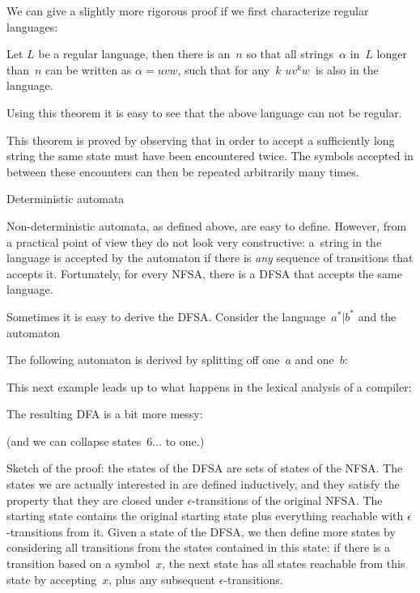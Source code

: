 We can give a slightly more rigorous proof if we first characterize
regular languages:
\begin{theorem}
Let $L$ be a regular language, then there is an~$n$ so that all
strings~$\alpha$ in~$L$ longer than~$n$ can be written as
$\alpha=uvw$, such that for any~$k$ $uv^kw$~is also in the language.
\end{theorem}
Using this theorem it is easy to see that the above language can not
be regular.

This theorem is proved by observing that in order to accept a
sufficiently long string the same state must have been encountered
twice. The symbols accepted in between these encounters can then be
repeated arbitrarily many times.

 {Deterministic automata}

Non-deterministic automata, as defined above, are easy to
define. However, from a practical point of view they do not look very
constructive: a~string in the language is accepted by the automaton if
there is \emph{any} sequence of transitions that accepts
it. Fortunately, for every NFSA, there is a DFSA that accepts the same
language.

Sometimes it is easy to derive the DFSA. Consider the
language~$a^*|b^*$ and the automaton


The following automaton is derived by splitting off one~$a$ and
one~$b$:


This next example leads up to what happens in the lexical analysis of
a compiler:


The resulting DFA is a bit more messy:


(and we can collapse states~$6\ldots$ to one.)

Sketch of the proof: the states of the DFSA are sets of states of the
NFSA. The states we are actually interested in are defined
inductively, and they satisfy the property that they are closed under
$\epsilon$-transitions of the original NFSA. The starting state
contains the original starting state plus everything reachable with
$\epsilon$-transitions from it. Given a state of the DFSA, we then
define more states by considering all transitions from the states
contained in this state: if there is a transition based on a
symbol~$x$, the next state has all states reachable from this state by
accepting~$x$, plus any subsequent $\epsilon$-transitions.

